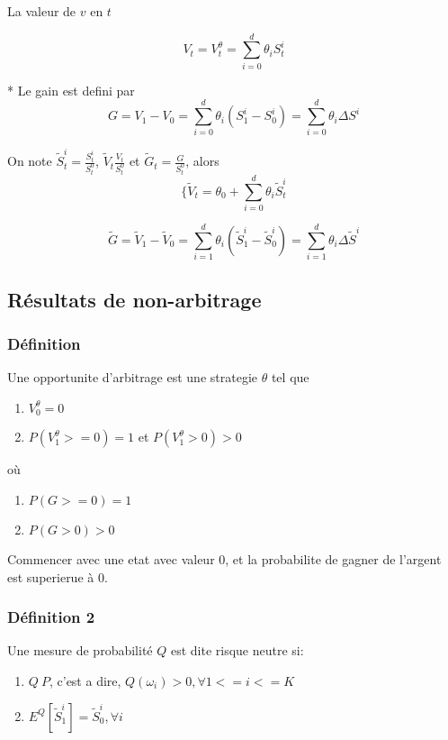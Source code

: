 \documentclass{article}
\begin{document}
La valeur de $v$ en $t$

\begin{equation}
V_t=V_t^\theta=\sum_{i=0}^d\theta_i S_t^i
\end{equation}

* Le gain est defini par 
\begin{equation}
G=V_1-V_0=\sum_{i=0}^d \theta_i (S_1^i-S_0^i)=\sum_{i=0}^d \theta_i \Delta S^i
\end{equation}

On note $\tilde{S}_t^i=\frac{S_t^i}{S_t^0}$, $\tilde{V}_t\frac{V_t}{S_t^0}$ et $\tilde{G}_t=\frac{G}{S_t^0}$,
alors
\begin{equation}
\{\tilde{V}_t=\theta_0+\sum_{i=0}^{d}\theta_i \tilde{S}_t^i
\end{equation}

\begin{equation}
\tilde{G}=\tilde{V}_1-\tilde{V}_0=\sum_{i=1}^d \theta_i (\tilde{S}_1^i-\tilde{S}_0^i)=\sum_{i=1}^d\theta_i\Delta \tilde{S}^i
\end{equation}

\subsection{R\'esultats de non-arbitrage}
\subsubsection{D\'efinition}

Une opportunite d'arbitrage est une strategie $\theta$ tel que 
\begin{enumerate}
	\item  $V_0^\theta =0$
	\item $P(V_1^\theta >=0) = 1$ et $P(V_1^\theta>0)>0$ 
\end{enumerate}
o\`u
\begin{enumerate}
	\item $P(G>=0) = 1$
	\item $P(G>0) > 0$
\end{enumerate}

Commencer avec une etat avec valeur $0$, et la probabilite de gagner de l'argent est superierue \`a $0$.

\subsubsection{D\'efinition 2}

Une mesure de probabilit\'e $Q$ est dite risque neutre si:
\begin{enumerate}
	\item $Q~P$, c'est a dire, $Q(\omega_i)>0, \forall 1<=i<=K$
	\item $E^Q[\tilde{S}_1^i]=\tilde{S}_0^i, \forall i$
\end{enumerate}
\end{document}
